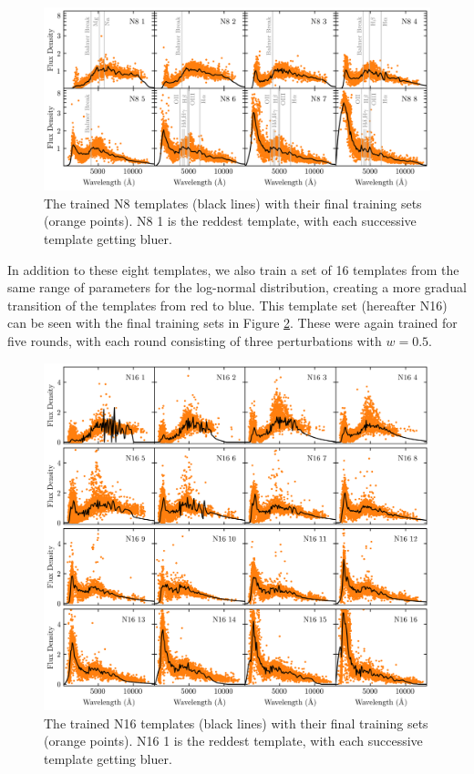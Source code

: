 \begin{figure}
    \centering
    \includegraphics{figures/N8_trained.png}
    \caption{The trained N8 templates (black lines) with their final training sets (orange points). N8 1 is the reddest template, with each successive template getting bluer. }
    \label{fig:N8_trained}
\end{figure}

In addition to these eight templates, we also train a set of 16 templates from the same range of parameters for the log-normal distribution, creating a more gradual transition of the templates from red to blue. 
This template set (hereafter N16) can be seen with the final training sets in Figure \ref{fig:N16_trained}. 
These were again trained for five rounds, with each round consisting of three perturbations with $w=0.5$. 

\begin{figure}
    \centering
    \includegraphics{figures/N16_trained.png}
    \caption{The trained N16 templates (black lines) with their final training sets (orange points). N16 1 is the reddest template, with each successive template getting bluer. }
    \label{fig:N16_trained}
\end{figure}

